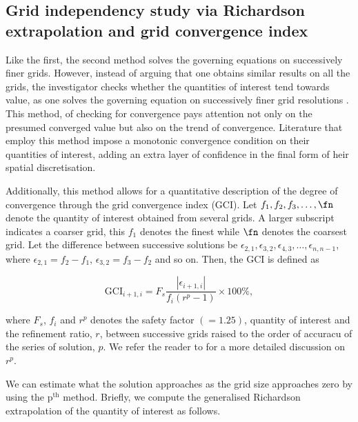 \documentclass[a4paper,fleqn]{cas-sc}
\begin{document}
\subsection{Grid independency study via Richardson extrapolation and grid convergence index} \label{ssec:richExtrap}
Like the first, the second method solves the governing equations on successively finer grids. However, instead of arguing that one obtains similar results on all the grids, the investigator checks whether the quantities of interest tend towards value, as one solves the governing equation on successively finer grid resolutions \citep{Richardson1927,Stern2001}. This method, of checking for convergence pays attention not only on the presumed converged value but also on the trend of convergence. Literature that employ this method impose a monotonic convergence condition \citep{Stern2001,MatAli2011,Ali2012,Maruai2018} on their quantities of interest, adding an extra layer of confidence in the final form of heir spatial discretisation.

Additionally, this method allows for a quantitative description of the degree of convergence through the grid convergence index (GCI). Let $f_{1},f_{2},f_{3},\dots,\fn$ denote the quantity of interest obtained from several grids. A larger subscript indicates a coarser grid, this $f_{1}$ denotes the finest while $\fn$ denotes the coarsest grid. Let the difference between successive solutions be $\epsilon_{2,1},\epsilon_{3,2},\epsilon_{4,3},\dots,\epsilon_{n,n-1}$, where $\epsilon_{2,1} = f_{2} - f_{1}$, $\epsilon_{3,2} = f_{3} - f_{2}$ and so on. Then, the GCI is defined as

\begin{equation}
  \text{GCI}_{i+1,i} = F_{s} \frac{\left |\epsilon_{i+1,i} \right |}{f_{i} \left ( r^{p} - 1 \right )} \times 100\%,
  \label{eq:gci}
\end{equation}

\noindent where $F_{s}$, $f_{i}$ and $r^{p}$ denotes the safety factor $\left ( = 1.25 \right )$, quantity of interest and the refinement ratio, $r$, between successive grids raised to the order of accuracu of the series of solution, $p$. We refer the reader to \citet{Stern2001,Langley2018} for a more detailed discussion on $r^{p}$.

We can estimate what the solution approaches as the grid size approaches zero by using the $\text{p}^{\text{th}}$ method. Briefly, we compute the generalised Richardson extrapolation of the quantity of interest as follows.
\end{document}
